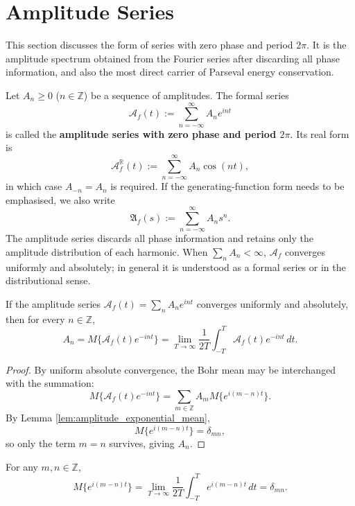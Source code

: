 \section{\texorpdfstring{Amplitude Series}{Amplitude Series}}

This section discusses the form of series with zero phase and period $2\pi$. It is the amplitude spectrum obtained from the Fourier series after discarding all phase information, and also the most direct carrier of Parseval energy conservation.

\begin{definition}\label{def:amplitude_series}
Let $A_n \ge 0$ ($n \in \mathbb{Z}$) be a sequence of amplitudes. The formal series
\[
\mathcal{A}_f(t) := \sum_{n=-\infty}^{\infty} A_n e^{i n t}
\]
is called the \textbf{amplitude series with zero phase and period $2\pi$}. Its real form is
\[
\mathcal{A}_f^{\mathbb{R}}(t) := \sum_{n=-\infty}^{\infty} A_n \cos(nt),
\]
in which case $A_{-n}=A_n$ is required. If the generating-function form needs to be emphasised, we also write
\[
\mathfrak{A}_f(s) := \sum_{n=-\infty}^{\infty} A_n s^n.
\]
The amplitude series discards all phase information and retains only the amplitude distribution of each harmonic. When $\sum_n A_n < \infty$, $\mathcal{A}_f$ converges uniformly and absolutely; in general it is understood as a formal series or in the distributional sense.
\end{definition}

\begin{proposition}\label{prop:amplitude_bohr_mean}
If the amplitude series $\mathcal{A}_f(t)=\sum_n A_n e^{int}$ converges uniformly and absolutely, then for every $n \in \mathbb{Z}$,
\[
A_n = M\{\mathcal{A}_f(t)e^{-int}\}
= \lim_{T\to\infty}\frac{1}{2T}\int_{-T}^{T}\mathcal{A}_f(t)e^{-int}\,dt.
\]
\end{proposition}

\begin{proof}
By uniform absolute convergence, the Bohr mean may be interchanged with the summation:
\[
M\{\mathcal{A}_f(t)e^{-int}\}
= \sum_{m\in\mathbb{Z}} A_m M\{e^{i(m-n)t}\}.
\]
By Lemma \ref{lem:amplitude_exponential_mean},
\[
M\{e^{i(m-n)t}\} = \delta_{mn},
\]
so only the term $m=n$ survives, giving $A_n$.
\end{proof}

\begin{lemma}\label{lem:amplitude_exponential_mean}
For any $m,n \in \mathbb{Z}$,
\[
M\{e^{i(m-n)t}\}
= \lim_{T\to\infty}\frac{1}{2T}\int_{-T}^{T} e^{i(m-n)t}\,dt
= \delta_{mn}.
\]
\end{lemma}

